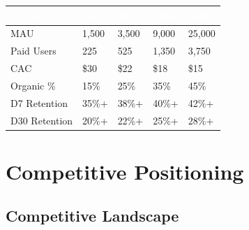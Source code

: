 \documentclass[11pt,a4paper]{article}
\begin{document}
\begin{center}
\begin{tabular}{L{3.5cm} R{2cm} R{2cm} R{2cm} R{2cm}}
    \toprule
    \textcolor{white}{\textbf{Metric}} & \textcolor{white}{\textbf{M6}} & \textcolor{white}{\textbf{M12}} & \textcolor{white}{\textbf{M24}} & \textcolor{white}{\textbf{M36}}\\
    \midrule
    MAU & 1,500 & 3,500 & 9,000 & 25,000\\
    Paid Users & 225 & 525 & 1,350 & 3,750\\
    CAC & \$30 & \$22 & \$18 & \$15\\
    Organic \% & 15\% & 25\% & 35\% & 45\%\\
    D7 Retention & 35\%+ & 38\%+ & 40\%+ & 42\%+\\
    D30 Retention & 20\%+ & 22\%+ & 25\%+ & 28\%+\\
    \bottomrule
\end{tabular}
\end{center}

\newpage

\section{Competitive Positioning}

\subsection{Competitive Landscape}
\end{document}
